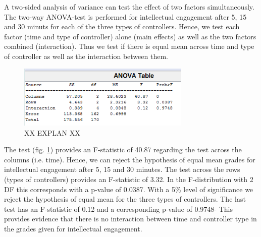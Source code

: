 A two-sided analysis of variance can test the effect of two factors simultaneously. The two-way ANOVA-test is performed for intellectual engagement after 5, 15 and 30 minuts for each of the three types of controllers. Hence, we test each factor (time and type of controller) alone (main effects) as well as the two factors combined (interaction). Thus we test if there is equal mean across time and type of controller as well as the interaction between them.

\begin{figure}[h]
	\begin{center}
		\includegraphics[height=3cm]{fig/anova2_testvalue.png}
		\caption{XX EXPLAN XX}
		\label{ANOVA_2}
	\end{center}
\end{figure}

The test (fig. \ref{ANOVA_2}) provides an F-statistic of 40.87 regarding the test across the columns (i.e. time). Hence, we can reject the hypothesis of equal mean grades for intellectual engagement after 5, 15 and 30 minutes. The test across the rows (types of controllers) provides an F-statistic of 3.32. In the F-distribution with 2 DF this corresponds with a p-value of 0.0387. With a 5\% level of significance we reject the hypothesis of equal mean for the three types of controllers. The last test has an F-statistic of 0.12 and a corresponding p-value of 0.9748- This provides evidence that there is no interaction between time and controller type in the grades given for intellectual engagement.